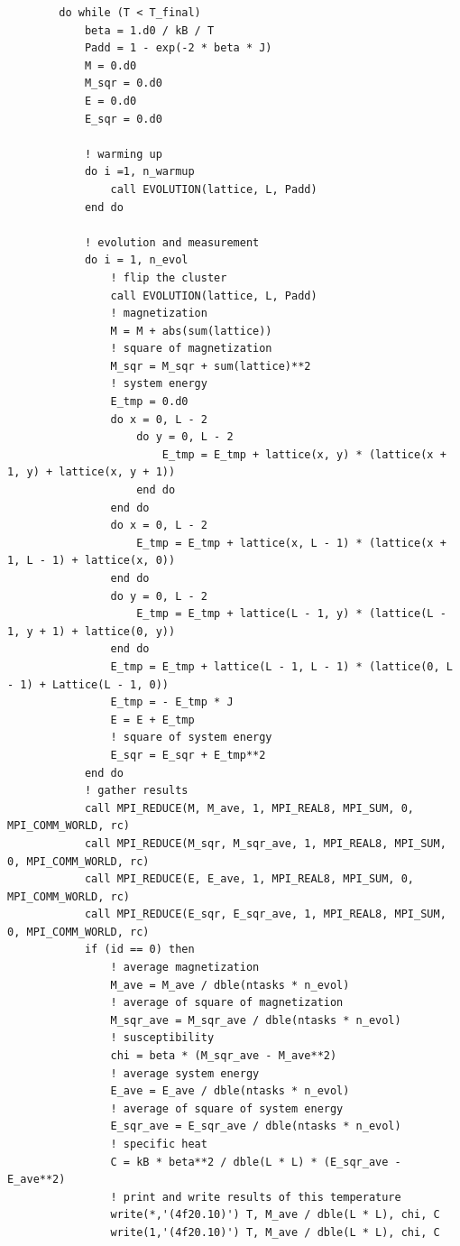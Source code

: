 \documentclass[UTF8,10pt,a4paper]{article}
\theoremstyle{Problem}
\theoremstyle{Solution}
\begin{document}
\begin{lstlisting}
        do while (T < T_final)
            beta = 1.d0 / kB / T
            Padd = 1 - exp(-2 * beta * J)
            M = 0.d0
            M_sqr = 0.d0
            E = 0.d0
            E_sqr = 0.d0

            ! warming up
            do i =1, n_warmup
                call EVOLUTION(lattice, L, Padd)
            end do

            ! evolution and measurement
            do i = 1, n_evol
                ! flip the cluster
                call EVOLUTION(lattice, L, Padd)
                ! magnetization
                M = M + abs(sum(lattice))
                ! square of magnetization
                M_sqr = M_sqr + sum(lattice)**2
                ! system energy
                E_tmp = 0.d0
                do x = 0, L - 2
                    do y = 0, L - 2
                        E_tmp = E_tmp + lattice(x, y) * (lattice(x + 1, y) + lattice(x, y + 1))
                    end do
                end do
                do x = 0, L - 2
                    E_tmp = E_tmp + lattice(x, L - 1) * (lattice(x + 1, L - 1) + lattice(x, 0))
                end do
                do y = 0, L - 2
                    E_tmp = E_tmp + lattice(L - 1, y) * (lattice(L - 1, y + 1) + lattice(0, y))
                end do
                E_tmp = E_tmp + lattice(L - 1, L - 1) * (lattice(0, L - 1) + Lattice(L - 1, 0))
                E_tmp = - E_tmp * J
                E = E + E_tmp
                ! square of system energy
                E_sqr = E_sqr + E_tmp**2
            end do
            ! gather results
            call MPI_REDUCE(M, M_ave, 1, MPI_REAL8, MPI_SUM, 0, MPI_COMM_WORLD, rc)
            call MPI_REDUCE(M_sqr, M_sqr_ave, 1, MPI_REAL8, MPI_SUM, 0, MPI_COMM_WORLD, rc)
            call MPI_REDUCE(E, E_ave, 1, MPI_REAL8, MPI_SUM, 0, MPI_COMM_WORLD, rc)
            call MPI_REDUCE(E_sqr, E_sqr_ave, 1, MPI_REAL8, MPI_SUM, 0, MPI_COMM_WORLD, rc)
            if (id == 0) then
                ! average magnetization
                M_ave = M_ave / dble(ntasks * n_evol)
                ! average of square of magnetization
                M_sqr_ave = M_sqr_ave / dble(ntasks * n_evol)
                ! susceptibility
                chi = beta * (M_sqr_ave - M_ave**2)
                ! average system energy
                E_ave = E_ave / dble(ntasks * n_evol)
                ! average of square of system energy
                E_sqr_ave = E_sqr_ave / dble(ntasks * n_evol)
                ! specific heat
                C = kB * beta**2 / dble(L * L) * (E_sqr_ave - E_ave**2)
                ! print and write results of this temperature
                write(*,'(4f20.10)') T, M_ave / dble(L * L), chi, C
                write(1,'(4f20.10)') T, M_ave / dble(L * L), chi, C


\end{lstlisting}
\end{document}

